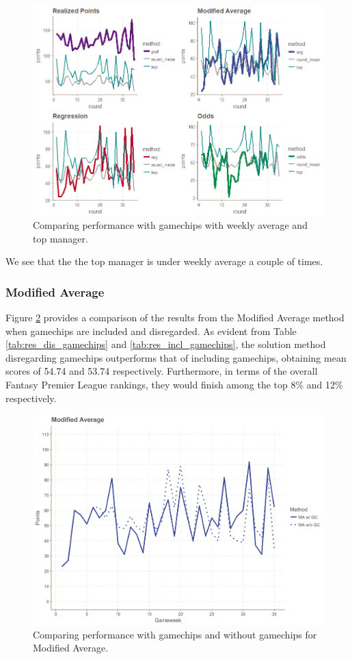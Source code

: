 \begin{figure}[H]
    \centering
    \includegraphics[scale=0.5]{fig/chapter_7/top_mean.png}
    \caption{Comparing performance with gamechips with weekly average and top manager.}
\label{fig:top_mean}    
\end{figure}

We see that the the top manager is under weekly average a couple of times.


\subsubsection{Modified Average}
Figure \ref{fig:avg_gc_no_gc} provides a comparison of the results from the Modified Average method when gamechips are included and disregarded. As evident from Table \ref{tab:res_dis_gamechips} and \ref{tab:res_incl_gamechips}, the solution method disregarding gamechips outperforms that of including gamechips, obtaining mean scores of 54.74 and 53.74 respectively. Furthermore, in terms of the overall Fantasy Premier League rankings, they would finish among the top 8\% and 12\% respectively. 


\begin{figure}[H]
    \centering
    \includegraphics[scale=0.5]{fig/chapter_7/avg_gc_no_gc.png}
    \caption{Comparing performance with gamechips and without gamechips for Modified Average.}
\label{fig:avg_gc_no_gc}    
\end{figure}


